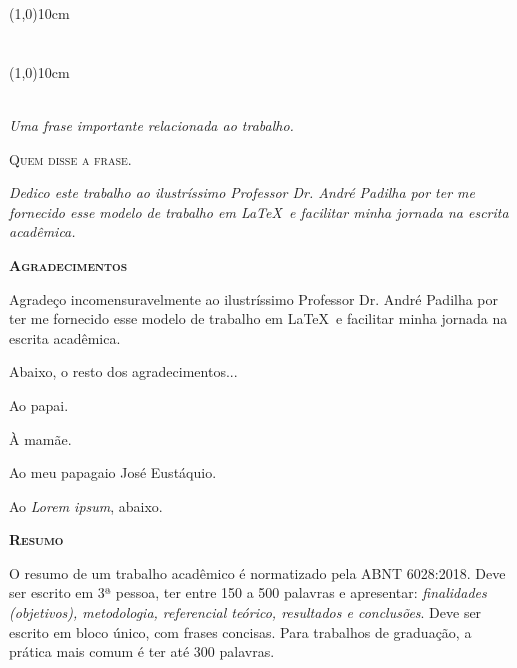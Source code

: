 {\begin{center}
        \vspace*{2cm}
        \line(1,0){10cm}\\
        \textbf{\titavaliadorum\ \avaliadorum}\\
        \localavalum\\
        	
        \vspace*{2cm}
        \line(1,0){10cm}\\
        \textbf{\titavaliadordois\ \avaliadordois}\\
        \localavaldois
    \end{center}

\newpage
\thispagestyle{empty}
\vspace*{\fill}
\epigraph{\textit{Uma frase importante relacionada ao trabalho.}}{\textsc{Quem disse a frase.}}

\newpage
\thispagestyle{empty}
\vspace*{15cm}
\begin{flushright}
    \SingleSpacing\textit{Dedico este trabalho ao ilustríssimo Professor Dr. André Padilha por ter me fornecido esse modelo de trabalho em \LaTeX\ e facilitar minha jornada na escrita acadêmica.}
\end{flushright}

\newpage
\pagestyle{empty}
\begin{center}
	\textbf{\textsc{Agradecimentos}}
\end{center}
Agradeço incomensuravelmente ao ilustríssimo Professor Dr. André Padilha por ter me fornecido esse modelo de trabalho em \LaTeX\ e facilitar minha jornada na escrita acadêmica.

\noindent Abaixo, o resto dos agradecimentos...

\noindent Ao papai.

\noindent À mamãe.

\noindent Ao meu papagaio José Eustáquio. 

\noindent Ao \textit{Lorem ipsum}, abaixo.

\noindent  \lipsum[10]

\newpage
\pagestyle{empty}
\begin{center}
    \textbf{\textsc{Resumo}}
\end{center}
\SingleSpacing\noindent
    O resumo de um trabalho acadêmico é normatizado pela ABNT 6028:2018. Deve ser escrito em 3ª pessoa, ter entre 150 a 500 palavras e apresentar: \textit{finalidades (objetivos), metodologia, referencial teórico, resultados e conclusões}. Deve ser escrito em bloco único, com frases concisas. Para trabalhos de graduação, a prática mais comum é ter até 300 palavras.

}
